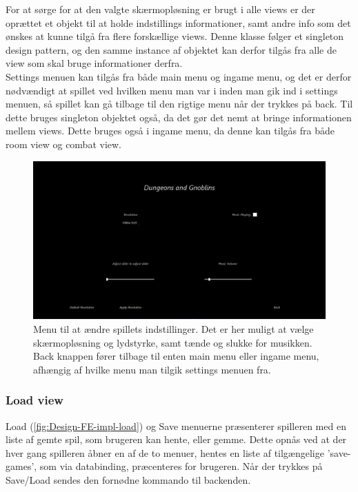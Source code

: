 \noindent For at sørge for at den valgte skærmopløsning er brugt i alle views er der oprættet et objekt til at holde indstillings informationer, samt andre info som det ønskes at kunne tilgå fra flere forskællige views. Denne klasse følger et singleton design pattern, og den samme instance af objektet kan derfor tilgås fra alle de view som skal bruge informationer derfra.\\

\noindent
Settings menuen kan tilgås fra både main menu og ingame menu, og det er derfor nødvændigt at spillet ved hvilken menu man var i inden man gik ind i settings menuen, så spillet kan gå tilbage til den rigtige menu når der trykkes på back. Til dette bruges singleton objektet også, da det gør det nemt at bringe informationen mellem views. Dette bruges også i ingame menu, da denne kan tilgås fra både room view og combat view.

\begin{figure}[h]
\centering
\includegraphics[width = \textwidth]{02-Body/Images/SettingsMenu_final.PNG}
\caption{Menu til at ændre spillets indstillinger. Det er her muligt at vælge skærmopløsning og lydstyrke, samt tænde og slukke for musikken. Back knappen fører tilbage til enten main menu eller ingame menu, afhængig af hvilke menu man tilgik settings menuen fra.}
\label{fig:Design-FE-impl-settings}
\end{figure}

\subsubsection{Load view}

Load (\autoref{fig:Design-FE-impl-load}) og Save menuerne præsenterer spilleren med en liste af gemte spil, som brugeren kan hente, eller gemme. Dette opnås ved at der hver gang spilleren åbner en af de to menuer, hentes en liste af tilgængelige 'save-games', som via databinding, præcenteres for brugeren. Når der trykkes på Save/Load sendes den fornødne kommando til backenden.

